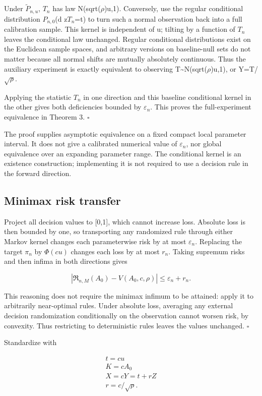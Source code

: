 Under \(\widetilde P_{n,u}\), \(T_n\) has law N(sqrt(\(\rho\))u,1). Conversely, use the regular conditional distribution \(P_{n,0}\)(d z\textbar{}\(T_n\)=t) to turn such a normal observation back into a full calibration sample. This kernel is independent of u; tilting by a function of \(T_n\) leaves the conditional law unchanged. Regular conditional distributions exist on the Euclidean sample spaces, and arbitrary versions on baseline-null sets do not matter because all normal shifts are mutually absolutely continuous. Thus the auxiliary experiment is exactly equivalent to observing T\textasciitilde N(sqrt(\(\rho\))u,1), or Y=T/\(\sqrt\rho\).

Applying the statistic \(T_n\) in one direction and this baseline conditional kernel in the other gives both deficiencies bounded by \(\varepsilon_n\). This proves the full-experiment equivalence in Theorem 3. \(\square\)

The proof supplies asymptotic equivalence on a fixed compact local parameter interval. It does not give a calibrated numerical value of \(\varepsilon_n\), nor global equivalence over an expanding parameter range. The conditional kernel is an existence construction; implementing it is not required to use a decision rule in the forward direction.

\subsection{Minimax risk transfer}\label{minimax-risk-transfer}

Project all decision values to {[}0,1{]}, which cannot increase loss. Absolute loss is then bounded by one, so transporting any randomized rule through either Markov kernel changes each parameterwise risk by at most \(\varepsilon_n\). Replacing the target \(\pi_n\) by \(\Phi(cu)\) changes each loss by at most \(r_n\). Taking supremum risks and then infima in both directions gives

\[
|\mathfrak R_{n,M}(A_0)-V(A_0,c,\rho)|\le\varepsilon_n+r_n.
\]

This reasoning does not require the minimax infimum to be attained: apply it to arbitrarily near-optimal rules. Under absolute loss, averaging any external decision randomization conditionally on the observation cannot worsen risk, by convexity. Thus restricting to deterministic rules leaves the values unchanged. \(\square\)

Standardize with

\[
\begin{gathered}
t=cu \\
K=cA_0 \\
X=cY=t+rZ \\
r=c/\sqrt\rho.
\end{gathered}
\]

